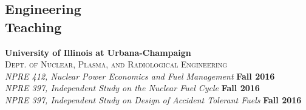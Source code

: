 \documentclass[margin,line]{resume}
\begin{document}
\begin{resume}
    \section{\mysidestyle Engineering\\Teaching}
    \textbf{University of Illinois at Urbana-Champaign}\\
    \textsc{Dept. of Nuclear, Plasma, and Radiological Engineering}\\ 
               \textsl{NPRE 412, Nuclear Power Economics and Fuel Management} 
               \hfill \textbf{Fall 2016}\\
               \textsl{NPRE 397, Independent Study on the Nuclear Fuel Cycle} 
               \hfill \textbf{Fall 2016}\\
               \textsl{NPRE 397, Independent Study on Design of Accident Tolerant Fuels} 
               \hfill \textbf{Fall 2016}


\end{resume}
\end{document}
